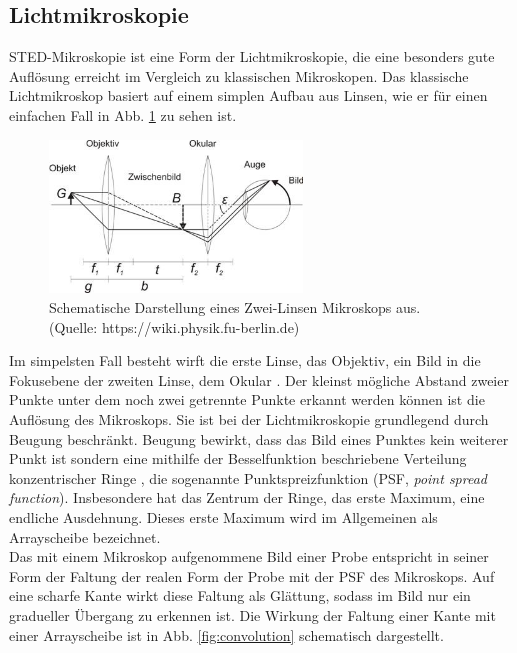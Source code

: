 \subsection{Lichtmikroskopie}
STED-Mikroskopie ist eine Form der Lichtmikroskopie, die eine besonders gute Auflösung erreicht im Vergleich zu klassischen Mikroskopen.
Das klassische Lichtmikroskop basiert auf einem simplen Aufbau aus Linsen, wie er für einen einfachen Fall in Abb. \ref{fig:lightmic} zu sehen ist.
\begin{figure}
	\centering
	\includegraphics[width=0.6\textwidth]{plots/micro.jpg}\caption{Schematische Darstellung eines Zwei-Linsen Mikroskops aus. (Quelle: https://wiki.physik.fu-berlin.de)}\label{fig:lightmic}
\end{figure}
Im simpelsten Fall besteht wirft die erste Linse, das Objektiv, ein Bild in die Fokusebene der zweiten Linse, dem Okular \cite{Dem2}.
Der kleinst mögliche Abstand zweier Punkte unter dem noch zwei getrennte Punkte erkannt werden können ist die Auflösung des Mikroskops.
Sie ist bei der Lichtmikroskopie grundlegend durch Beugung beschränkt.
Beugung bewirkt, dass das Bild eines Punktes kein weiterer Punkt ist sondern eine mithilfe der Besselfunktion beschriebene Verteilung konzentrischer Ringe \cite{Born}, die sogenannte Punktspreizfunktion (PSF, \emph{point spread function}).
Insbesondere hat das Zentrum der Ringe, das erste Maximum, eine endliche Ausdehnung.
Dieses erste Maximum wird im Allgemeinen als Arrayscheibe bezeichnet.
\\
Das mit einem Mikroskop aufgenommene Bild einer Probe entspricht in seiner Form der Faltung der realen Form der Probe mit der PSF des Mikroskops.
Auf eine scharfe Kante wirkt diese Faltung als Glättung, sodass im Bild nur ein gradueller Übergang zu erkennen ist.
Die Wirkung der Faltung einer Kante mit einer Arrayscheibe ist in Abb. \ref{fig:convolution} schematisch dargestellt.\\
